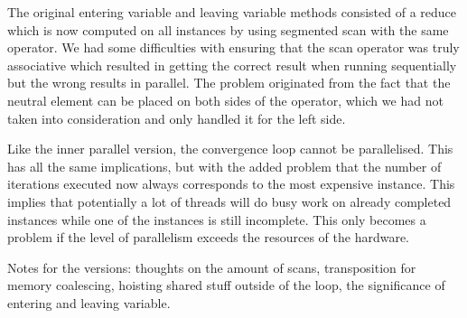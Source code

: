 The original entering variable and leaving variable methods consisted of a reduce which is now computed on all instances by using segmented scan with the same operator. We had some difficulties with ensuring that the scan operator was truly associative which resulted in getting the correct result when running sequentially but the wrong results in parallel. The problem originated from the fact that the neutral element can be placed on both sides of the operator, which we had not taken into consideration and only handled it for the left side.

Like the inner parallel version, the convergence loop cannot be parallelised. This has all the same implications, but with the added problem that the number of iterations executed now always corresponds to the most expensive instance. This implies that potentially a lot of threads will do busy work on already completed instances while one of the instances is still incomplete. This only becomes a problem if the level of parallelism exceeds the resources of the hardware.

Notes for the versions: thoughts on the amount of scans, transposition for memory coalescing, hoisting shared stuff outside of the loop, the significance of entering and leaving variable.